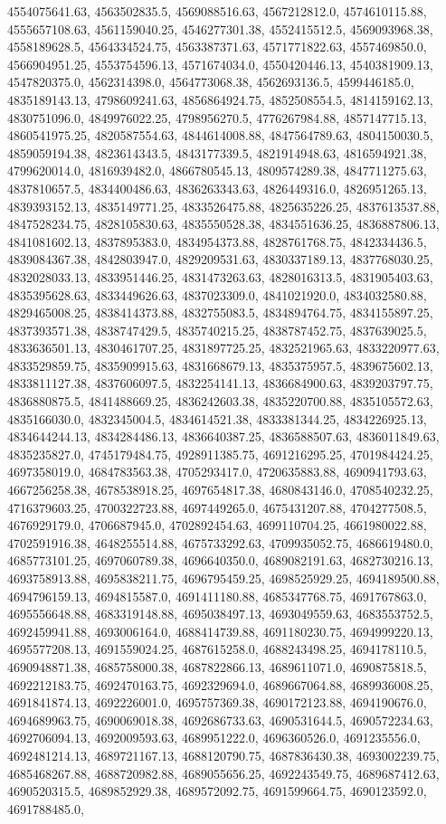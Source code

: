 4554075641.63, 4563502835.5, 4569088516.63, 4567212812.0, 4574610115.88, 4555657108.63, 4561159040.25, 4546277301.38, 4552415512.5, 4569093968.38, 4558189628.5, 4564334524.75, 4563387371.63, 4571771822.63, 4557469850.0, 4566904951.25, 4553754596.13, 4571674034.0, 4550420446.13, 4540381909.13, 4547820375.0, 4562314398.0, 4564773068.38, 4562693136.5, 4599446185.0, 4835189143.13, 4798609241.63, 4856864924.75, 4852508554.5, 4814159162.13, 4830751096.0, 4849976022.25, 4798956270.5, 4776267984.88, 4857147715.13, 4860541975.25, 4820587554.63, 4844614008.88, 4847564789.63, 4804150030.5, 4859059194.38, 4823614343.5, 4843177339.5, 4821914948.63, 4816594921.38, 4799620014.0, 4816939482.0, 4866780545.13, 4809574289.38, 4847711275.63, 4837810657.5, 4834400486.63, 4836263343.63, 4826449316.0, 4826951265.13, 4839393152.13, 4835149771.25, 4833526475.88, 4825635226.25, 4837613537.88, 4847528234.75, 4828105830.63, 4835550528.38, 4834551636.25, 4836887806.13, 4841081602.13, 4837895383.0, 4834954373.88, 4828761768.75, 4842334436.5, 4839084367.38, 4842803947.0, 4829209531.63, 4830337189.13, 4837768030.25, 4832028033.13, 4833951446.25, 4831473263.63, 4828016313.5, 4831905403.63, 4835395628.63, 4833449626.63, 4837023309.0, 4841021920.0, 4834032580.88, 4829465008.25, 4838414373.88, 4832755083.5, 4834894764.75, 4834155897.25, 4837393571.38, 4838747429.5, 4835740215.25, 4838787452.75, 4837639025.5, 4833636501.13, 4830461707.25, 4831897725.25, 4832521965.63, 4833220977.63, 4833529859.75, 4835909915.63, 4831668679.13, 4835375957.5, 4839675602.13, 4833811127.38, 4837606097.5, 4832254141.13, 4836684900.63, 4839203797.75, 4836880875.5, 4841488669.25, 4836242603.38, 4835220700.88, 4835105572.63, 4835166030.0, 4832345004.5, 4834614521.38, 4833381344.25, 4834226925.13, 4834644244.13, 4834284486.13, 4836640387.25, 4836588507.63, 4836011849.63, 4835235827.0, 4745179484.75, 4928911385.75, 4691216295.25, 4701984424.25, 4697358019.0, 4684783563.38, 4705293417.0, 4720635883.88, 4690941793.63, 4667256258.38, 4678538918.25, 4697654817.38, 4680843146.0, 4708540232.25, 4716379603.25, 4700322723.88, 4697449265.0, 4675431207.88, 4704277508.5, 4676929179.0, 4706687945.0, 4702892454.63, 4699110704.25, 4661980022.88, 4702591916.38, 4648255514.88, 4675733292.63, 4709935052.75, 4686619480.0, 4685773101.25, 4697060789.38, 4696640350.0, 4689082191.63, 4682730216.13, 4693758913.88, 4695838211.75, 4696795459.25, 4698525929.25, 4694189500.88, 4694796159.13, 4694815587.0, 4691411180.88, 4685347768.75, 4691767863.0, 4695556648.88, 4683319148.88, 4695038497.13, 4693049559.63, 4683553752.5, 4692459941.88, 4693006164.0, 4688414739.88, 4691180230.75, 4694999220.13, 4695577208.13, 4691559024.25, 4687615258.0, 4688243498.25, 4694178110.5, 4690948871.38, 4685758000.38, 4687822866.13, 4689611071.0, 4690875818.5, 4692212183.75, 4692470163.75, 4692329694.0, 4689667064.88, 4689936008.25, 4691841874.13, 4692226001.0, 4695757369.38, 4690172123.88, 4694190676.0, 4694689963.75, 4690069018.38, 4692686733.63, 4690531644.5, 4690572234.63, 4692706094.13, 4692009593.63, 4689951222.0, 4696360526.0, 4691235556.0, 4692481214.13, 4689721167.13, 4688120790.75, 4687836430.38, 4693002239.75, 4685468267.88, 4688720982.88, 4689055656.25, 4692243549.75, 4689687412.63, 4690520315.5, 4689852929.38, 4689572092.75, 4691599664.75, 4690123592.0, 4691788485.0, 